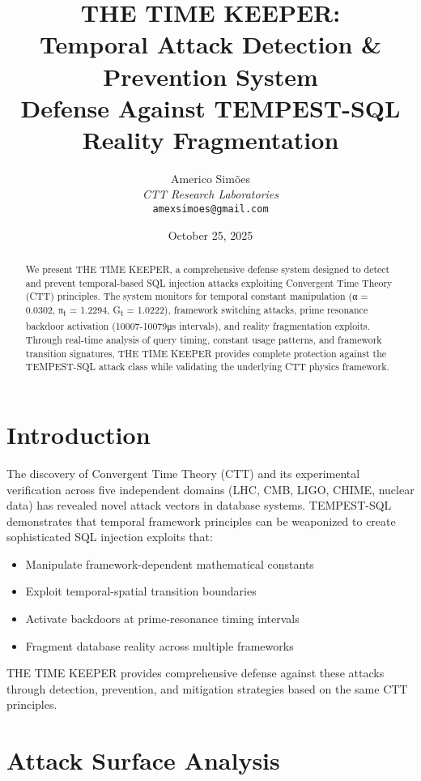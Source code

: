 \documentclass[11pt,a4paper]{article}
\title{\textbf{THE TIME KEEPER:}\\
Temporal Attack Detection \& Prevention System\\
\large Defense Against TEMPEST-SQL Reality Fragmentation}
\author{Americo Simões\\
\textit{CTT Research Laboratories}\\
\texttt{amexsimoes@gmail.com}}
\date{October 25, 2025}
\begin{document}
\maketitle

\begin{abstract}
We present THE TIME KEEPER, a comprehensive defense system designed to detect and prevent temporal-based SQL injection attacks exploiting Convergent Time Theory (CTT) principles. The system monitors for temporal constant manipulation (α = 0.0302, π\textsubscript{t} = 1.2294, G\textsubscript{t} = 1.0222), framework switching attacks, prime resonance backdoor activation (10007-10079μs intervals), and reality fragmentation exploits. Through real-time analysis of query timing, constant usage patterns, and framework transition signatures, THE TIME KEEPER provides complete protection against the TEMPEST-SQL attack class while validating the underlying CTT physics framework.
\end{abstract}

\section{Introduction}

The discovery of Convergent Time Theory (CTT) and its experimental verification across five independent domains (LHC, CMB, LIGO, CHIME, nuclear data) has revealed novel attack vectors in database systems. TEMPEST-SQL demonstrates that temporal framework principles can be weaponized to create sophisticated SQL injection exploits that:

\begin{itemize}
    \item Manipulate framework-dependent mathematical constants
    \item Exploit temporal-spatial transition boundaries
    \item Activate backdoors at prime-resonance timing intervals
    \item Fragment database reality across multiple frameworks
\end{itemize}

THE TIME KEEPER provides comprehensive defense against these attacks through detection, prevention, and mitigation strategies based on the same CTT principles.

\section{Attack Surface Analysis}
\end{document}

